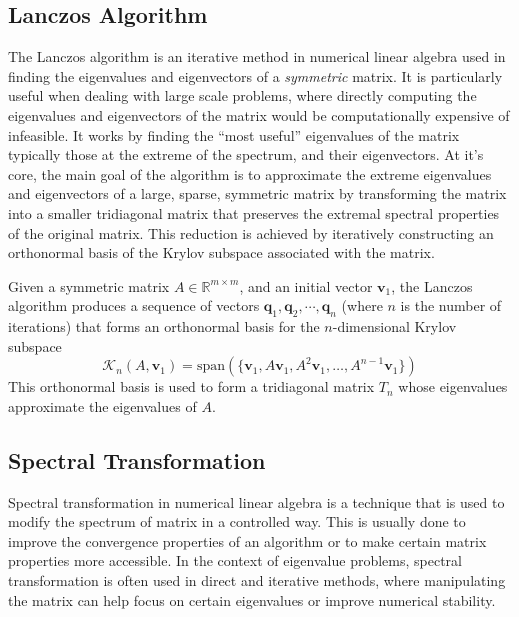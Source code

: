 \subsection{Lanczos Algorithm}\label{sec:LanczosAlgorithm}

The Lanczos algorithm is an iterative method in numerical linear algebra used in finding the eigenvalues and eigenvectors of a \textit{symmetric} matrix. It is particularly useful when dealing with large scale problems, where directly computing the eigenvalues and eigenvectors of the matrix would be computationally expensive of infeasible. It works by finding the ``most useful'' eigenvalues of the matrix \textemdash\, typically those at the extreme of the spectrum, and their eigenvectors. At it's core, the main goal of the algorithm is to approximate the extreme eigenvalues and eigenvectors of a large, sparse, symmetric matrix by transforming the matrix into a smaller tridiagonal matrix that preserves the extremal spectral properties of the original matrix. This reduction is achieved by iteratively constructing an orthonormal basis of the Krylov subspace associated with the matrix.

Given a symmetric matrix $A \in \mathbb{R}^{m\times m}$, and an initial vector $\mathbf{v}_1$, the Lanczos algorithm produces a sequence of vectors $\mathbf{q}_1, \mathbf{q}_2, \cdots, \mathbf{q}_n$ (where $n$ is the number of iterations) that forms an orthonormal basis for the $n$-dimensional Krylov subspace
\begin{equation}\label{eq:KrylovSubspaceDefinition}
       \mathcal{K}_n(A, \mathbf{v}_1) = \text{span}(\{\mathbf{v}_1, A\mathbf{v}_1, A^2\mathbf{v}_1, \ldots, A^{n-1}\mathbf{v}_1\})
\end{equation}
This orthonormal basis is used to form a tridiagonal matrix $T_n$ whose eigenvalues approximate the eigenvalues of $A$.

\subsection{Spectral Transformation}
\label{sec:SpectralTransformationDefinition}

Spectral transformation in numerical linear algebra is a technique that is used to modify the spectrum of matrix in a controlled way. This is usually done to improve the convergence properties of an algorithm or to make certain matrix properties more accessible. In the context of eigenvalue problems, spectral transformation is often used in direct and iterative methods, where manipulating the matrix can help focus on certain eigenvalues or improve numerical stability.

